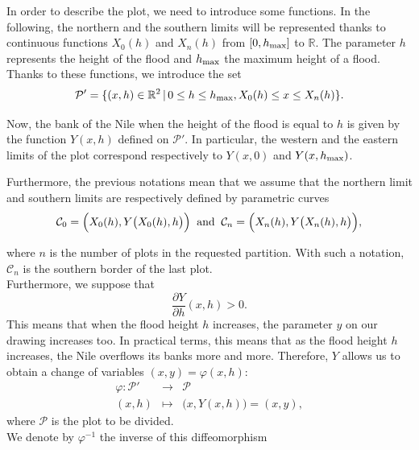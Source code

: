 \documentclass[A4paper, 12pt]{article}
\def\cC{{\mathcal{C}}}
\def\cP{\mathcal{P}}
\def\RR{{\mathbb{R}}}
\begin{document}
In order to describe the plot, we need to introduce some functions.
In the following, the northern and the southern limits will be represented thanks to
continuous functions $X_0(h)$ and $X_n(h)$ from $[0,h_{\rm max}]$ to
$\RR$. The parameter $h$ represents the height of the flood and
$h_{\rm max}$ the maximum height of a flood.\\ Thanks to these
functions, we introduce the set
$$\mathcal{P}'=\{ (x,h) \in \RR^2  \,|\, 0\leq h \leq h_{\rm max}, X_0(h) \leq x \leq X_n(h)\}.$$

Now, the bank of the Nile when the height of the flood is equal to $h$
is given by the function $Y(x,h)$ defined on $\mathcal{P}'$. In
particular, the western and the eastern limits of the plot
correspond respectively to $Y(x,0)$ and $Y(x,h_{\rm
  max})$.

Furthermore, the previous notations mean that we assume
that the northern limit and southern limits are respectively defined
by parametric curves
\begin{equation}\label{eq:bord}
\cC_{0}=\Big(X_{0}(h),Y\big(X_{0}(h),h\big)\Big)\>\hbox{ and }\>\cC_{n}=\Big(X_{n}(h),Y\big(X_{n}(h),h\big)\Big),
\end{equation}

where $n$ is the number of plots in the requested
partition. With such a notation, $\cC_{n}$ is the southern
border of the last plot.\\


    
Furthermore, we suppose that 
\begin{equation}\label{eq:Ygt0}
  \dfrac{\partial Y}{\partial h}(x,h)>0.
\end{equation}
  This means that when the
flood height $h$ increases, the parameter $y$ on our drawing
increases too. In practical terms, this means that as the flood height $h$
increases, the Nile overflows its banks more and more.  Therefore, $Y$
allows us to obtain a change of variables
$(x,y)=\varphi(x,h)$:
\begin{equation}
  \begin{array}{rll}\label{eq:chgt_var_1}
    \varphi: \mathcal{P}' & \longrightarrow & \cP\\
           (x,h) & \longmapsto &  \big(x, Y(x,h) \big)=(x,y),
  \end{array}
\end{equation}
where $\cP$ is the plot to be divided.\\

We denote by  $\varphi^{-1}$ the inverse of this diffeomorphism
\end{document}
